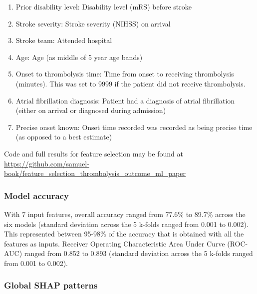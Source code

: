 \begin{enumerate}
    \item Prior disability level: Disability level (mRS) before stroke
    \item Stroke severity: Stroke severity (NIHSS) on arrival
    \item Stroke team: Attended hospital
    \item Age: Age (as middle of 5 year age bands)
    \item Onset to thrombolysis time: Time from onset to receiving thrombolysis (minutes). This was set to 9999 if the patient did not receive thrombolysis.
    \item Atrial fibrillation diagnosis: Patient had a diagnosis of atrial fibrillation (either on arrival or diagnosed during admission)
    \item Precise onset known: Onset time recorded was recorded as being precise time (as opposed to a best estimate)
\end{enumerate}

Code and full results for feature selection may be found at \url{https://github.com/samuel-book/feature_selection_thrombolysis_outcome_ml_paper}

\subsubsection{Model accuracy}

With 7 input features, overall accuracy ranged from 77.6\% to 89.7\% across the six models (standard deviation across the 5 k-folds ranged from 0.001 to 0.002). This represented between 95-98\% of the accuracy that is obtained with all the features as inputs. Receiver Operating Characteristic Area Under Curve (ROC-AUC) ranged from 0.852 to 0.893 (standard deviation across the 5 k-folds ranged from 0.001 to 0.002).

\subsubsection{Global SHAP patterns}

